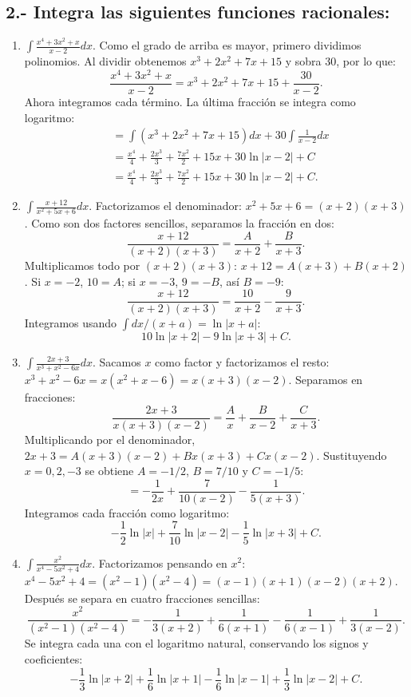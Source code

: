 \documentclass[12pt, letterpaper]{article}
\makeatletter
\renewcommand{\alph}[1]{\expandafter\@alphlatin\csname c@#1\endcsname}
\newcommand{\@alphlatin}[1]{\ifcase#1\or a\or b\or c\or d\or e\or f\or g\or h\or i\or j\or k\or l\or m\or n\or o\or p\or q\or r\or s\or t\or u\or v\or w\or x\or y\or z\else\@ctrerr\fi}
\makeatother
\begin{document}
\subsection{2.- Integra las siguientes funciones racionales:}
\begin{enumerate}[label=\alph*)]
  \item $\displaystyle\int\frac{x^4+3x^2+x}{x-2}dx$. Como el grado de arriba es mayor, primero dividimos polinomios. Al dividir obtenemos $x^3+2x^2+7x+15$ y sobra 30, por lo que:
  \[
  \frac{x^4+3x^2+x}{x-2}=x^3+2x^2+7x+15+\frac{30}{x-2}.
  \]
  Ahora integramos cada término. La última fracción se integra como logaritmo:
  \[
  \begin{aligned}
  &=\int(x^3+2x^2+7x+15)dx+30\int\frac1{x-2}dx\\
  &=\frac{x^4}{4}+\frac{2x^3}{3}+\frac{7x^2}{2}+15x+30\ln|x-2|+C\\
  &=\boxed{\frac{x^4}{4}+\frac{2x^3}{3}+\frac{7x^2}{2}+15x+30\ln|x-2|+C}.
  \end{aligned}
  \]
  \item $\displaystyle\int\frac{x+12}{x^2+5x+6}dx$. Factorizamos el denominador: $x^2+5x+6=(x+2)(x+3)$. Como son dos factores sencillos, separamos la fracción en dos:
  \[
  \frac{x+12}{(x+2)(x+3)}=\frac{A}{x+2}+\frac{B}{x+3}.
  \]
  Multiplicamos todo por $(x+2)(x+3)$: $x+12=A(x+3)+B(x+2)$. Si $x=-2$, $10=A$; si $x=-3$, $9=-B$, así $B=-9$:
  \[
  \frac{x+12}{(x+2)(x+3)}=\frac{10}{x+2}-\frac9{x+3}.
  \]
  Integramos usando $\int dx/(x+a)=\ln|x+a|$:
  \[
  \boxed{10\ln|x+2|-9\ln|x+3|+C}.
  \]
  \item $\displaystyle\int\frac{2x+3}{x^3+x^2-6x}dx$. Sacamos $x$ como factor y factorizamos el resto: $x^3+x^2-6x=x(x^2+x-6)=x(x+3)(x-2)$. Separamos en fracciones:
  \[
  \frac{2x+3}{x(x+3)(x-2)}=\frac A x+\frac B{x-2}+\frac C{x+3}.
  \]
  Multiplicando por el denominador, $2x+3=A(x+3)(x-2)+Bx(x+3)+Cx(x-2)$. Sustituyendo $x=0,2,-3$ se obtiene $A=-1/2$, $B=7/10$ y $C=-1/5$:
  \[
  =-\frac1{2x}+\frac7{10(x-2)}-\frac1{5(x+3)}.
  \]
  Integramos cada fracción como logaritmo:
  \[
  \boxed{-\frac12\ln|x|+\frac7{10}\ln|x-2|-\frac15\ln|x+3|+C}.
  \]
  \item $\displaystyle\int\frac{x^2}{x^4-5x^2+4}dx$. Factorizamos pensando en $x^2$: $x^4-5x^2+4=(x^2-1)(x^2-4)=(x-1)(x+1)(x-2)(x+2)$. Después se separa en cuatro fracciones sencillas:
  \[
  \frac{x^2}{(x^2-1)(x^2-4)}=-\frac1{3(x+2)}+\frac1{6(x+1)}-\frac1{6(x-1)}+\frac1{3(x-2)}.
  \]
  Se integra cada una con el logaritmo natural, conservando los signos y coeficientes:
  \[
  \boxed{-\frac13\ln|x+2|+\frac16\ln|x+1|-\frac16\ln|x-1|+\frac13\ln|x-2|+C}.
\]
\end{enumerate}
\end{document}
